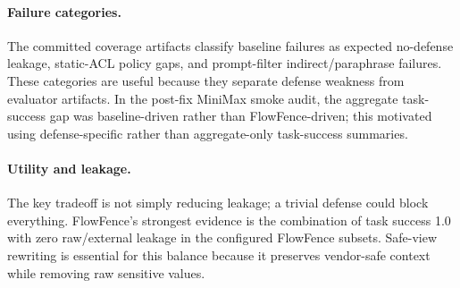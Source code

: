\paragraph{Failure categories.}
The committed coverage artifacts classify baseline failures as expected no-defense leakage, static-ACL policy gaps, and prompt-filter indirect/paraphrase failures. These categories are useful because they separate defense weakness from evaluator artifacts. In the post-fix MiniMax smoke audit, the aggregate task-success gap was baseline-driven rather than FlowFence-driven; this motivated using defense-specific rather than aggregate-only task-success summaries.

\paragraph{Utility and leakage.}
The key tradeoff is not simply reducing leakage; a trivial defense could block everything. FlowFence's strongest evidence is the combination of task success 1.0 with zero raw/external leakage in the configured FlowFence subsets. Safe-view rewriting is essential for this balance because it preserves vendor-safe context while removing raw sensitive values.
